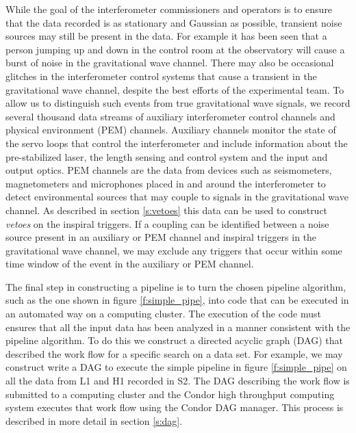 While the goal of the interferometer commissioners and operators is to ensure
that the data recorded is as stationary and Gaussian as possible, transient
noise sources may still be present in the data. For example it has been seen
that a person jumping up and down in the control room at the observatory will
cause a burst of noise in the gravitational wave channel. There may also be
occasional glitches in the interferometer control systems that cause a
transient in the gravitational wave channel, despite the best efforts of the
experimental team. To allow us to distinguish such events from true
gravitational wave signals, we record several thousand data streams of
auxiliary interferometer control channels and physical environment (PEM)
channels. Auxiliary channels monitor the state of the servo loops that control
the interferometer and include information about the pre-stabilized laser, the
length sensing and control system and the input and output optics. PEM
channels are the data from devices such as seismometers, magnetometers and
microphones placed in and around the interferometer to detect environmental
sources that may couple to signals in the gravitational wave channel. As
described in section \ref{s:vetoes} this data can be used to construct
\emph{vetoes} on the inspiral triggers. If a coupling can be identified
between a noise source present in an auxiliary or PEM channel and inspiral
triggers in the gravitational wave channel, we may exclude any triggers that
occur within some time window of the event in the auxiliary or PEM channel.

The final step in constructing a pipeline is to turn the chosen pipeline
algorithm, such as the one shown in figure \ref{f:simple_pipe}, into code that
can be executed in an automated way on a computing cluster. The execution of
the code must ensures that all the input data has been analyzed in a manner
consistent with the pipeline algorithm. To do this we construct a directed
acyclic graph (DAG) that described the work flow for a specific search on a
data set. For example, we may construct write a DAG to execute the simple
pipeline in figure \ref{f:simple_pipe} on all the data from L1 and H1 recorded
in S2. The DAG describing the work flow is submitted to a computing cluster and
the Condor high throughput computing system executes that work flow using the
Condor DAG manager. This process is described in more detail in section
\ref{s:dag}.

